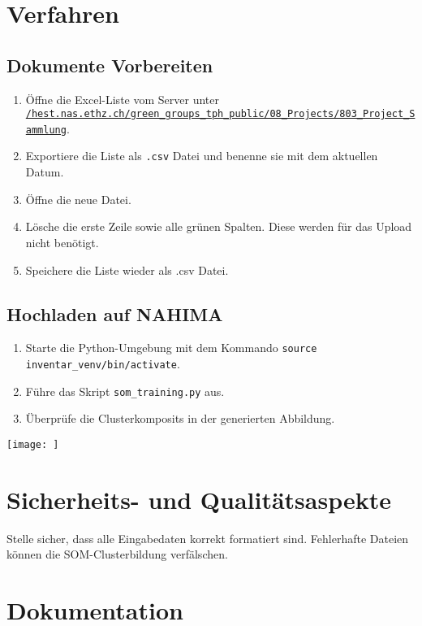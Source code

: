 \section{Verfahren}

\subsection{Dokumente Vorbereiten}
\begin{enumerate}
    \item Öffne die Excel-Liste vom Server unter \texttt{\url{/hest.nas.ethz.ch/green_groups_tph_public/08_Projects/803_Project_Sammlung}}.
    \item Exportiere die Liste als \texttt{.csv} Datei und benenne sie mit dem aktuellen Datum.
    \item Öffne die neue Datei.
     \item Lösche die erste Zeile sowie alle grünen Spalten. Diese werden für das Upload nicht benötigt.
     \item Speichere die Liste wieder als .csv Datei.
\end{enumerate}

\subsection{Hochladen auf NAHIMA}
\begin{enumerate}
    \item Starte die Python-Umgebung mit dem Kommando \texttt{source inventar\_venv/bin/activate}.
    \item Führe das Skript \texttt{som\_training.py} aus.
    \item Überprüfe die Clusterkomposits in der generierten Abbildung.
\end{enumerate}


\begin{center}
    \texttt{[image: ]}
\end{center}

\section{Sicherheits- und Qualitätsaspekte}
Stelle sicher, dass alle Eingabedaten korrekt formatiert sind.  
Fehlerhafte Dateien können die SOM-Clusterbildung verfälschen.

\section{Dokumentation}
